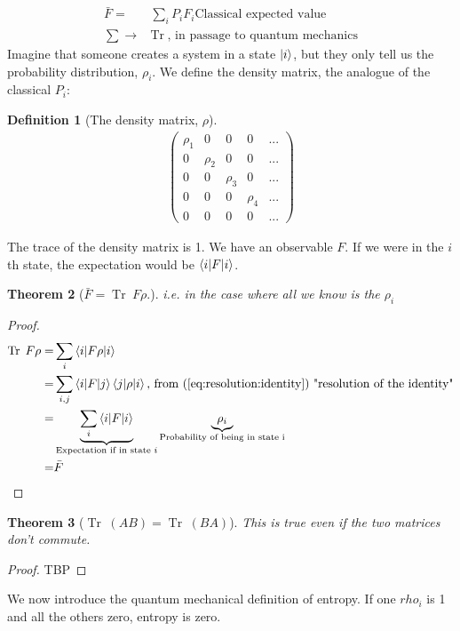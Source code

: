 \documentclass[]{article}
\newtheorem{thm}{Theorem}
\newtheorem{defn}[thm]{Definition}
\DeclareMathOperator{\Tr}{Tr \;}
\begin{document}
\begin{align*}
	\bar{F} =& \sum_i P_i F_i \text{Classical expected value}\\
	\sum \rightarrow& \Tr \text{, in passage to quantum mechanics}
\end{align*}
Imagine that someone creates a system in a state $\ket{i}$, but they only tell us the probability distribution, $\rho_i$. We define the density matrix, the analogue of the classical $P_i$:
\begin{defn}[The density matrix, $\rho$]
	\begin{align*}
		\begin{pmatrix}
			\rho_1&0&0&0&...\\
			0&\rho_2&0&0&...\\
			0&0&\rho_3&0&...\\
			0&0&0&\rho_4&...\\
			0&0&0&0&...
		\end{pmatrix}
	\end{align*}
\end{defn}
The trace of the density matrix is 1.
We have an observable $F$. If we were in the $i$th state, the expectation would be $\braket{i\vert F \vert i}$.
\begin{thm}[$\bar{F}= \Tr F \rho$.]
	i.e. in the case where all we know is the $\rho_i$
\end{thm}
\begin{proof}
	\begin{align*}
		\Tr F \rho=&\sum_i \braket{i \vert F \rho \vert i}\\
		=& \sum_{i,j} \braket{i \vert F \vert j} \braket{j \vert \rho \vert i} \text{, from (\ref{eq:resolution:identity}) "resolution of the identity"}\\
		=& \underbrace{\sum_i \braket{i \vert F \vert i}}_\text{Expectation if in state $i$} \underbrace{\rho_i}_\text{Probability of being in state i}\\
		=& \bar{F}
	\end{align*}
\end{proof}

\begin{thm}[$\Tr(AB)=\Tr(BA)$]This is true even if the two matrices don't commute.
\end{thm}
\begin{proof}
	TBP
\end{proof}
We now introduce the quantum mechanical definition of entropy. If one $rho_i$ is 1 and all the others zero, entropy is zero.
\end{document}
